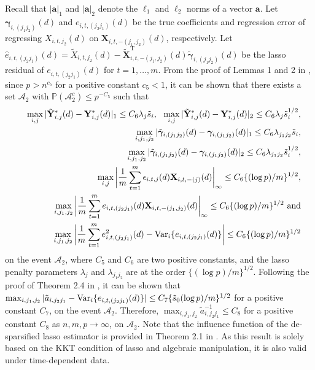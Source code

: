 \documentclass[12pt]{article}
\numberwithin{equation}{section}
\def\bea{\begin{eqnarray}}
\def\eea{\end{eqnarray}}
\def\nn{\nonumber}
\def\T{{ \mathrm{\scriptscriptstyle T} }}
\newcommand{\V}{\rm Var}
\newcommand{\bX}{{\mathbf X}}
\newcommand{\bY}{{\mathbf Y}}
\newcommand{\ba}{{\mathbf a}}
\newcommand{\bgamma}{\boldsymbol{\gamma}}
\begin{document}
Recall that $|\ba|_1$ and $|\ba|_2$ denote the $\ell_1$ and $\ell_2$ norms of a vector $\ba$.
Let $\bgamma_{i, (j_1j_2)}(d)$ and $e_{i, t, (j_2j_1)}(d)$ be the true coefficients and regression error of regressing $X_{i, t, j_2}(d)$ on $\bX_{i, t, -(j_1, j_2)}(d)$, respectively.
Let $\hat{e}_{i, t, (j_2j_1)}(d) = \tilde{X}_{i, t, j_2}(d) - \tilde{\bX}_{i, t, -(j_1, j_2)}^{\T}(d)\tilde{\bgamma}_{i, (j_1j_2)}(d)$ be the lasso residual of $e_{i, t, (j_2j_1)}(d)$ for $t = 1, \ldots, m$.
From the proof of Lemmas 1 and 2 in \cite{ChangQiuYao_2016}, 
since $p > n^{c_5}$ for a positive constant $c_5 < 1$,
it can be shown that there exists a set $\mathcal{A}_2$ with $\mathbb{P}(\mathcal{A}_2^{c}) \leq p^{-C_5}$ such that  
\bea
&&\max_{i, j}|\tilde{\bY}_{i, j}^{\ast}(d) - \bY_{i, j}^{\ast}(d) |_1 \leq C_6 \lambda_{j} \tilde{s}_i, \ \ 
\max_{i, j}|\tilde{\bY}_{i, j}^{\ast}(d) - \bY_{i, j}^{\ast}(d) |_2 \leq C_6 \lambda_{j} \tilde{s}_i^{1/2}, \nn \\
&&\max_{i, j_1, j_2}|\tilde{\bgamma}_{i, (j_1j_2)}(d) - \bgamma_{i, (j_1j_2)}(d) |_1 \leq C_6 \lambda_{j_1j_2} \tilde{s}_i, \nn \\ 
&&\max_{i, j_1, j_2}|\tilde{\bgamma}_{i, (j_1j_2)}(d) - \bgamma_{i, (j_1j_2)}(d) |_2 \leq C_6 \lambda_{j_1j_2} \tilde{s}_i^{1/2}, \nn \\
&& \max_{i, j} \bigg| \frac{1}{m}\sum_{t = 1}^{m} \epsilon_{i, t, j}(d) \bX_{i, t, -(j)}(d) \bigg|_{\infty} \leq C_6 \{(\log p) / m\}^{1/2}, \nn \\
&& \max_{i, j_1, j_2} \bigg| \frac{1}{m}\sum_{t = 1}^{m} e_{i, t, (j_2j_1)}(d) \bX_{i, t, -(j_1, j_2)}(d) \bigg|_{\infty} \leq C_6 \{(\log p) / m\}^{1/2} \ \mbox{and}   \nn \\
&&\max_{i, j_1, j_2} \bigg| \frac{1}{m}\sum_{t = 1}^{m} e_{i, t, (j_2j_1)}^2(d) - {\V}_{i}\{e_{i, t, (j_2j_1)}(d)\} \bigg| \leq C_6 \{(\log p) / m\}^{1/2} \nn
\eea
on the event $\mathcal{A}_2$, where $C_5$ and $C_6$ are two positive constants, and the lasso penalty parameters $\lambda_j$ and $\lambda_{j_1j_2}$ are at the order $\{(\log p) / m\}^{1/2}$.
Following the proof of Theorem 2.4 in \cite{vanderGeerRitov2014}, it can be shown that $\max_{i, j_1, j_2}|\tilde{a}_{i, j_2j_1} - {\V}_{i}\{e_{i, t, (j_2j_1)}(d)\} | \leq C_7 \{\tilde{s}_0 (\log p) / m\}^{1/2}$ for a positive constant $C_7$, on the event $\mathcal{A}_2$. Therefore, $\max_{i, j_1, j_2}\tilde{a}_{i, j_2j_1}^{-1} \leq C_8$ for a positive constant $C_8$ as $n, m, p \to \infty$, on $\mathcal{A}_2$.
Note that the influence function of the de-sparsified lasso estimator is provided in Theorem 2.1 in \cite{vanderGeerRitov2014}. As this result is solely based on the KKT condition of lasso and algebraic manipulation, it is also valid under time-dependent data.
\end{document}
